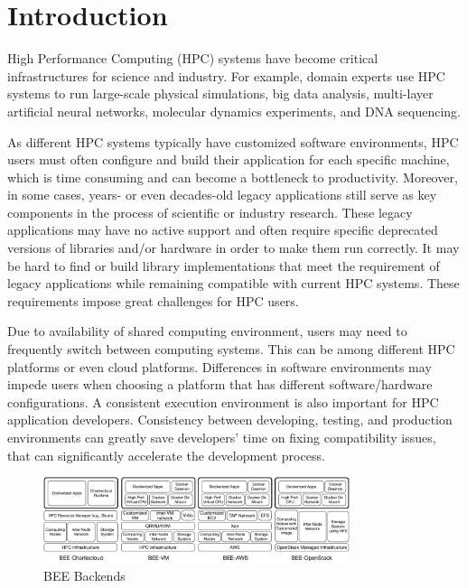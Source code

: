 \section{Introduction}
  \label{sec:introduction}

High Performance Computing (HPC) systems have become critical infrastructures for science and industry. For example, domain experts use HPC systems to run large-scale physical simulations, big data analysis, multi-layer artificial neural networks, molecular dynamics experiments, and DNA sequencing.

As different HPC systems typically have customized software environments, HPC users must often configure and build their application for each specific machine, which is time consuming and can become a bottleneck to productivity. Moreover, in some cases, years- or even decades-old legacy applications still serve as key components in the process of scientific or industry research.  These legacy applications may have no active support and often require specific deprecated versions of libraries and/or hardware in order to make them run correctly. It may be hard to find or build library implementations that meet the requirement of legacy applications while remaining compatible with current HPC systems. These requirements impose great challenges for HPC users.  




Due to availability of shared computing environment, users may need to frequently switch between computing systems. This can be among different HPC platforms or even cloud platforms. Differences in software environments may impede users when choosing a platform that has different software/hardware configurations. A consistent execution environment is also important for HPC application developers. Consistency between developing, testing, and production environments can greatly save developers' time on fixing compatibility issues, that can significantly accelerate the development process.



\begin{figure}[h!]
    \centering
    \includegraphics[width=0.8\textwidth]{figures/bee-framework-detail.pdf}
    \caption{BEE Backends}
    \label{bee-backend}
\end{figure}


